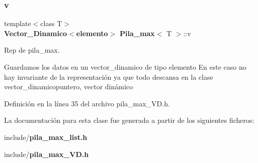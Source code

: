 \subsubsection{v}
{\footnotesize\ttfamily template$<$class T$>$ \\
{\bf Vector\+\_\+\+Dinamico}$<${\bf elemento}$>$ {\bf Pila\+\_\+max}$<$ T $>$\+::v\hspace{0.3cm}{\ttfamily [private]}}



Rep de pila\+\_\+max. 

Guardamos los datos en un vector\+\_\+dinamico de tipo elemento En este caso no hay invariante de la representación ya que todo descansa en la clase vector\+\_\+dinamicopuntero, vector dinámico 

Definición en la línea 35 del archivo pila\+\_\+max\+\_\+\+V\+D.\+h.



La documentación para esta clase fue generada a partir de los siguientes ficheros\+:\begin{DoxyCompactItemize}
\item 
include/{\bf pila\+\_\+max\+\_\+list.\+h}\item 
include/{\bf pila\+\_\+max\+\_\+\+V\+D.\+h}\end{DoxyCompactItemize}
